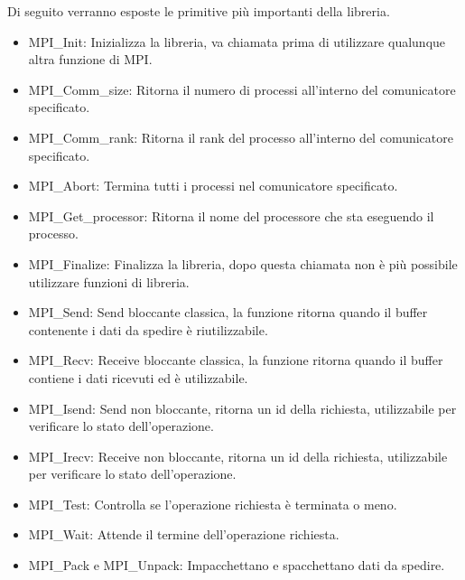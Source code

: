 Di seguito verranno esposte le primitive più importanti della libreria.
\begin{itemize}
\item MPI\_Init: Inizializza la libreria, va chiamata prima di utilizzare qualunque altra funzione di MPI.
\item MPI\_Comm\_size: Ritorna il numero di processi all'interno del comunicatore specificato.
\item MPI\_Comm\_rank: Ritorna il rank del processo all'interno del comunicatore specificato.
\item MPI\_Abort: Termina tutti i processi nel comunicatore specificato.
\item MPI\_Get\_processor: Ritorna il nome del processore che sta eseguendo il processo.
\item MPI\_Finalize: Finalizza la libreria, dopo questa chiamata non è più possibile utilizzare funzioni di libreria.
\item MPI\_Send: Send bloccante classica, la funzione ritorna quando il buffer contenente i dati da spedire è riutilizzabile.
\item MPI\_Recv: Receive bloccante classica, la funzione ritorna quando il buffer contiene i dati ricevuti ed è utilizzabile.
\item MPI\_Isend: Send non bloccante, ritorna un id della richiesta, utilizzabile per verificare lo stato dell'operazione.
\item MPI\_Irecv: Receive non bloccante, ritorna un id della richiesta, utilizzabile per verificare lo stato dell'operazione.
\item MPI\_Test: Controlla se l'operazione richiesta è terminata o meno.
\item MPI\_Wait: Attende il termine dell'operazione richiesta.
\item MPI\_Pack e MPI\_Unpack: Impacchettano e spacchettano dati da spedire.
\end{itemize}
